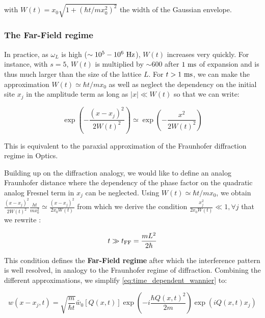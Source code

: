 \noindent with $W(t)=x_{0} \sqrt{1+\left(\hbar t / m x_{0}^{2}\right)^{2}}$ the width of the Gaussian envelope.

\subsubsection{The Far-Field regime}

In practice, as $\omega_L$ is high ($\sim 10^5-10^6 \ \rm{Hz}$), $W(t)$ increases very quickly. For instance, with $s=5$, $W(t)$ is multiplied by $\sim 600$ after $1 \ \rm{ms}$ of expansion and is thus much larger than the size of the lattice $L$. For $t>1 \ \rm{ms}$, we can make the approximation $W(t) \simeq \hbar t/m x_0$ as well as neglect the dependency on the initial site $x_j$ in the amplitude term as long as $|x| \ll W(t)$ so that we can write:

\begin{equation}
    \exp \left(-\frac{\left(x-x_{j}\right)^{2}}{2 W(t)^{2}}\right) \simeq \exp \left(-\frac{x^{2}}{2 W(t)^{2}}\right)
\end{equation}

\noindent This is equivalent to the paraxial approximation of the Fraunhofer diffraction regime in Optics.

Building up on the diffraction analogy, we would like to define an analog Fraunhofer distance where the dependency of the phase factor on the quadratic analog Fresnel term in $x_j$ can be neglected. Using $W(t) \simeq \hbar t/m x_0$, we obtain $\frac{\left(x-x_{j}\right)^{2}}{2 W(t)^{2}} \frac{h t}{m x_{0}^{2}} \simeq \frac{\left(x-x_{j}\right)^{2}}{2 x_0 W(t)}$ from which we derive the condition $\frac{x_j^2}{2 x_0 W(t)} \ll 1, \forall j$ that we rewrite \cite{gerbier2008expansion,toth2008theory}:

\begin{equation}
    t \gg t_{\rm{FF}} = \frac{mL^2}{2 \hbar}
\end{equation}

\noindent This condition defines the \textbf{Far-Field regime} after which the interference pattern is well resolved, in analogy to the Fraunhofer regime of diffraction. Combining the different approximations, we simplify \ref{eq:time_dependent_wannier} to:

\begin{equation}
    w\left(x-x_{j}, t\right)=\sqrt{\frac{m}{\hbar t}} \tilde{w_0}[Q(x,t)] \exp\left(-i \frac{\hbar Q(x,t)^{2}}{2 m} \right) \exp\left(i Q(x,t) x_{j}\right)
\end{equation}

